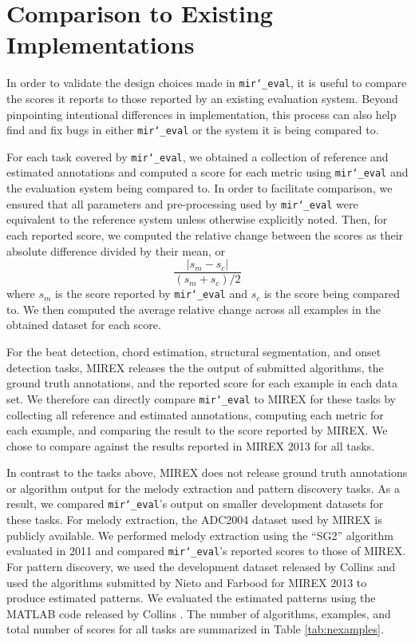 \documentclass{article}
\def\mireval{\texttt{mir\char`_eval}}
\begin{document}
\section{Comparison to Existing Implementations}
\label{sec:comparison}

In order to validate the design choices made in \mireval{}, it is useful to compare the scores it reports to those reported by an existing evaluation system.
Beyond pinpointing intentional differences in implementation, this process can also help find and fix bugs in either \mireval{} or the system it is being compared to.

For each task covered by \mireval{}, we obtained a collection of reference and estimated annotations and computed a score for each metric using \mireval{} and the evaluation system being compared to.
In order to facilitate comparison, we ensured that all parameters and pre-processing used by \mireval{} were equivalent to the reference system unless otherwise explicitly noted.
Then, for each reported score, we computed the relative change between the scores as their absolute difference divided by their mean, or
$$
\frac{|s_m - s_c|}{(s_m + s_c)/2}
$$
where $s_m$ is the score reported by \mireval{} and $s_c$ is the score being compared to.
We then computed the average relative change across all examples in the obtained dataset for each score.

For the beat detection, chord estimation, structural segmentation, and onset detection tasks, MIREX releases the the output of submitted algorithms, the ground truth annotations, and the reported score for each example in each data set.
We therefore can directly compare \mireval{} to MIREX for these tasks by collecting all reference and estimated annotations, computing each metric for each example, and comparing the result to the score reported by MIREX.
We chose to compare against the results reported in MIREX 2013 for all tasks.

In contrast to the tasks above, MIREX does not release ground truth annotations or algorithm output for the melody extraction and pattern discovery tasks.
As a result, we compared \mireval{}'s output on smaller development datasets for these tasks.
For melody extraction, the ADC2004 dataset used by MIREX is publicly available.
We performed melody extraction using the ``SG2'' algorithm evaluated in 2011 \cite{salamon2011melody} and compared \mireval{}'s reported scores to those of MIREX.
For pattern discovery, we used the development dataset released by Collins \cite{Collins2013} and used the algorithms submitted by Nieto and Farbood \cite{nieto2013discovery} for MIREX 2013 to produce estimated patterns.
We evaluated the estimated patterns using the MATLAB code released by Collins \cite{Collins2013}.
The number of algorithms, examples, and total number of scores for all tasks are summarized in Table \ref{tab:nexamples}.
\end{document}
